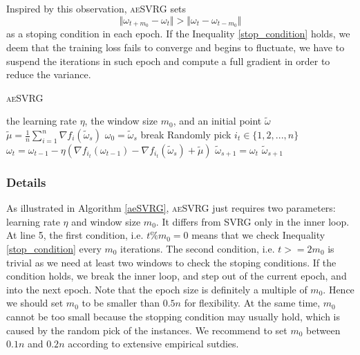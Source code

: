 \documentclass[conference]{IEEEtran}
\begin{document}
 Inspired by this observation, \textsc{aeSVRG}  sets 
 \begin{equation}
 \label{stop_condition}
 \Vert\omega_{t+m_0}-\omega_t\Vert>\Vert\omega_{t}-\omega_{t-m_0}\Vert
 \end{equation}
 as a stoping condition in each epoch. If the Inequality \ref{stop_condition} holds, we deem that the training loss fails to converge and begins to fluctuate, we have to suspend the iterations in such epoch and compute a full gradient in order to reduce the variance.
 
  \begin{algorithm}[t]
 	\caption{\textsc{aeSVRG}}
	\label{aeSVRG}
	\begin{algorithmic}[1]
	\Require the learning rate $\eta$, the window size $m_0$, and an initial point $\tilde{\omega}$
		\State $\tilde{\mu} = \frac{1}{n}\sum\limits_{i=1}^{n}\nabla f_{i}(\tilde{\omega}_{s})$
		\State $\omega_0 = \tilde{\omega}_s$
			\State break
			\EndIf
			\State Randomly pick $i_t\in\{1, 2, ..., n\}$
			\State $\omega_t = \omega_{t-1} - \eta(\nabla f_{i_t}(\omega_{t-1}) - \nabla f_{i_t}(\tilde{\omega}_s)+\tilde{\mu})$
		\EndFor		
		\State $\tilde{\omega}_{s+1} = \omega_{t}$
	\EndFor
	\State \Return $\tilde{\omega}_{s+1}$
	\end{algorithmic}
\end{algorithm}

 
\subsubsection{Details}
As illustrated in Algorithm \ref{aeSVRG}, \textsc{aeSVRG} just requires two parameters: learning rate $\eta$ and window size $m_0$. It differs from SVRG only in the inner loop. At line 5, the first condition, i.e. $t\%m_0=0$ means that  we check Inequality \ref{stop_condition} every $m_0$ iterations. The second condition, i.e. $t>=2m_0$ is trivial as we need at least two windows to check the stoping conditions.  If the condition holds, we break the inner loop, and step out of the current epoch, and into the next epoch. Note that the epoch size is definitely a multiple of $m_0$. Hence we should set $m_0$ to be smaller than $0.5n$ for flexibility. At the same time, $m_0$ cannot be too small because the stopping condition may usually hold, which is caused by the random pick of the instances. We recommend to set $m_0$ between $0.1n$ and $0.2n$ according to extensive empirical sutdies.
\end{document}
